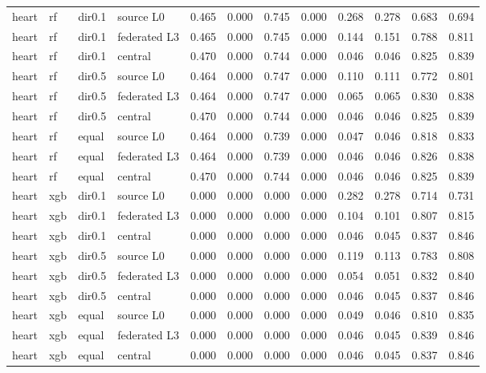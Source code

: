 \begin{tabular}{llllllllllll}
\addlinespace
heart & rf & dir0.1 & source L0 & 0.465 & 0.000 & 0.745 & 0.000 & 0.268 & 0.278 & 0.683 & 0.694 \\
heart & rf & dir0.1 & federated L3 & 0.465 & 0.000 & 0.745 & 0.000 & 0.144 & 0.151 & 0.788 & 0.811 \\
heart & rf & dir0.1 & central & 0.470 & 0.000 & 0.744 & 0.000 & 0.046 & 0.046 & 0.825 & 0.839 \\
heart & rf & dir0.5 & source L0 & 0.464 & 0.000 & 0.747 & 0.000 & 0.110 & 0.111 & 0.772 & 0.801 \\
heart & rf & dir0.5 & federated L3 & 0.464 & 0.000 & 0.747 & 0.000 & 0.065 & 0.065 & 0.830 & 0.838 \\
heart & rf & dir0.5 & central & 0.470 & 0.000 & 0.744 & 0.000 & 0.046 & 0.046 & 0.825 & 0.839 \\
heart & rf & equal & source L0 & 0.464 & 0.000 & 0.739 & 0.000 & 0.047 & 0.046 & 0.818 & 0.833 \\
heart & rf & equal & federated L3 & 0.464 & 0.000 & 0.739 & 0.000 & 0.046 & 0.046 & 0.826 & 0.838 \\
heart & rf & equal & central & 0.470 & 0.000 & 0.744 & 0.000 & 0.046 & 0.046 & 0.825 & 0.839 \\
heart & xgb & dir0.1 & source L0 & 0.000 & 0.000 & 0.000 & 0.000 & 0.282 & 0.278 & 0.714 & 0.731 \\
heart & xgb & dir0.1 & federated L3 & 0.000 & 0.000 & 0.000 & 0.000 & 0.104 & 0.101 & 0.807 & 0.815 \\
heart & xgb & dir0.1 & central & 0.000 & 0.000 & 0.000 & 0.000 & 0.046 & 0.045 & 0.837 & 0.846 \\
heart & xgb & dir0.5 & source L0 & 0.000 & 0.000 & 0.000 & 0.000 & 0.119 & 0.113 & 0.783 & 0.808 \\
heart & xgb & dir0.5 & federated L3 & 0.000 & 0.000 & 0.000 & 0.000 & 0.054 & 0.051 & 0.832 & 0.840 \\
heart & xgb & dir0.5 & central & 0.000 & 0.000 & 0.000 & 0.000 & 0.046 & 0.045 & 0.837 & 0.846 \\
heart & xgb & equal & source L0 & 0.000 & 0.000 & 0.000 & 0.000 & 0.049 & 0.046 & 0.810 & 0.835 \\
heart & xgb & equal & federated L3 & 0.000 & 0.000 & 0.000 & 0.000 & 0.046 & 0.045 & 0.839 & 0.846 \\
heart & xgb & equal & central & 0.000 & 0.000 & 0.000 & 0.000 & 0.046 & 0.045 & 0.837 & 0.846 \\
\bottomrule
\end{tabular}
